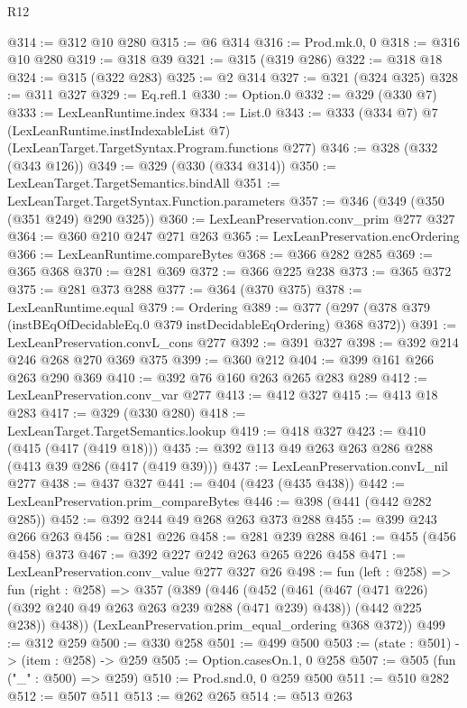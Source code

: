 \begin{lexlean}{R12}
\begin{coremodule}
@314 := @312 @10 @280
@315 := @6 @314
@316 := Prod.mk.{0, 0}
@318 := @316 @10 @280
@319 := @318 @39
@321 := @315 (@319 @286)
@322 := @318 @18
@324 := @315 (@322 @283)
@325 := @2 @314
@327 := @321 (@324 @325)
@328 := @311 @327
@329 := Eq.refl.{1}
@330 := Option.{0}
@332 := @329 (@330 @7)
@333 := LexLeanRuntime.index
@334 := List.{0}
@343 := @333
    (@334 @7)
    @7
    (LexLeanRuntime.instIndexableList @7)
    (LexLeanTarget.TargetSyntax.Program.functions @277)
@346 := @328 (@332 (@343 @126))
@349 := @329 (@330 (@334 @314))
@350 := LexLeanTarget.TargetSemantics.bindAll
@351 := LexLeanTarget.TargetSyntax.Function.parameters
@357 := @346 (@349 (@350 (@351 @249) @290 @325))
@360 := LexLeanPreservation.conv_prim @277 @327
@364 := @360 @210 @247 @271 @263
@365 := LexLeanPreservation.encOrdering
@366 := LexLeanRuntime.compareBytes
@368 := @366 @282 @285
@369 := @365 @368
@370 := @281 @369
@372 := @366 @225 @238
@373 := @365 @372
@375 := @281 @373 @288
@377 := @364 (@370 @375)
@378 := LexLeanRuntime.equal
@379 := Ordering
@389 := @377 (@297 (@378 @379 (instBEqOfDecidableEq.{0} @379 instDecidableEqOrdering) @368 @372))
@391 := LexLeanPreservation.convL_cons @277
@392 := @391 @327
@398 := @392 @214 @246 @268 @270 @369 @375
@399 := @360 @212
@404 := @399 @161 @266 @263 @290 @369
@410 := @392 @76 @160 @263 @265 @283 @289
@412 := LexLeanPreservation.conv_var @277
@413 := @412 @327
@415 := @413 @18 @283
@417 := @329 (@330 @280)
@418 := LexLeanTarget.TargetSemantics.lookup
@419 := @418 @327
@423 := @410 (@415 (@417 (@419 @18)))
@435 := @392 @113 @49 @263 @263 @286 @288 (@413 @39 @286 (@417 (@419 @39)))
@437 := LexLeanPreservation.convL_nil @277
@438 := @437 @327
@441 := @404 (@423 (@435 @438))
@442 := LexLeanPreservation.prim_compareBytes
@446 := @398 (@441 (@442 @282 @285))
@452 := @392 @244 @49 @268 @263 @373 @288
@455 := @399 @243 @266 @263
@456 := @281 @226
@458 := @281 @239 @288
@461 := @455 (@456 @458) @373
@467 := @392 @227 @242 @263 @265 @226 @458
@471 := LexLeanPreservation.conv_value @277 @327 @26
@498 := fun (left : @258) =>
  fun (right : @258) =>
  @357
    (@389
      (@446
        (@452
          (@461
            (@467 (@471 @226) (@392 @240 @49 @263 @263 @239 @288 (@471 @239) @438))
            (@442 @225 @238))
          @438))
      (LexLeanPreservation.prim_equal_ordering @368 @372))
@499 := @312 @259
@500 := @330 @258
@501 := @499 @500
@503 := (state : @501) -> (item : @258) -> @259
@505 := Option.casesOn.{1, 0} @258
@507 := @505 (fun ("_" : @500) => @259)
@510 := Prod.snd.{0, 0} @259 @500
@511 := @510 @282
@512 := @507 @511
@513 := @262 @265
@514 := @513 @263

\end{coremodule}
\end{lexlean}
